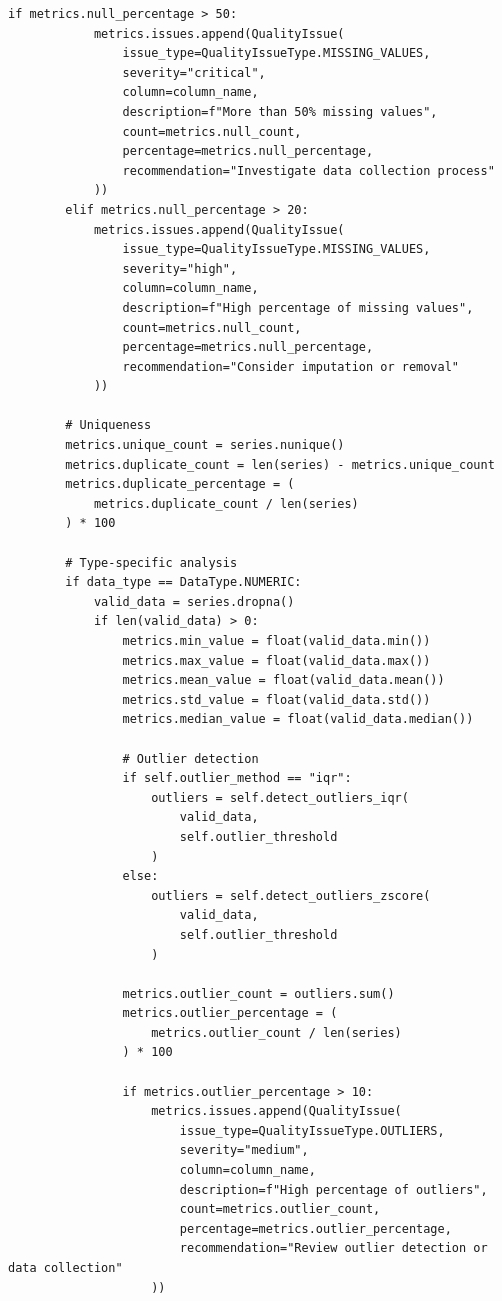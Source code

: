 \begin{lstlisting}[style=python, caption={Data quality metrics with statistical validation}]
        if metrics.null_percentage > 50:
            metrics.issues.append(QualityIssue(
                issue_type=QualityIssueType.MISSING_VALUES,
                severity="critical",
                column=column_name,
                description=f"More than 50% missing values",
                count=metrics.null_count,
                percentage=metrics.null_percentage,
                recommendation="Investigate data collection process"
            ))
        elif metrics.null_percentage > 20:
            metrics.issues.append(QualityIssue(
                issue_type=QualityIssueType.MISSING_VALUES,
                severity="high",
                column=column_name,
                description=f"High percentage of missing values",
                count=metrics.null_count,
                percentage=metrics.null_percentage,
                recommendation="Consider imputation or removal"
            ))

        # Uniqueness
        metrics.unique_count = series.nunique()
        metrics.duplicate_count = len(series) - metrics.unique_count
        metrics.duplicate_percentage = (
            metrics.duplicate_count / len(series)
        ) * 100

        # Type-specific analysis
        if data_type == DataType.NUMERIC:
            valid_data = series.dropna()
            if len(valid_data) > 0:
                metrics.min_value = float(valid_data.min())
                metrics.max_value = float(valid_data.max())
                metrics.mean_value = float(valid_data.mean())
                metrics.std_value = float(valid_data.std())
                metrics.median_value = float(valid_data.median())

                # Outlier detection
                if self.outlier_method == "iqr":
                    outliers = self.detect_outliers_iqr(
                        valid_data,
                        self.outlier_threshold
                    )
                else:
                    outliers = self.detect_outliers_zscore(
                        valid_data,
                        self.outlier_threshold
                    )

                metrics.outlier_count = outliers.sum()
                metrics.outlier_percentage = (
                    metrics.outlier_count / len(series)
                ) * 100

                if metrics.outlier_percentage > 10:
                    metrics.issues.append(QualityIssue(
                        issue_type=QualityIssueType.OUTLIERS,
                        severity="medium",
                        column=column_name,
                        description=f"High percentage of outliers",
                        count=metrics.outlier_count,
                        percentage=metrics.outlier_percentage,
                        recommendation="Review outlier detection or data collection"
                    ))


\end{lstlisting}
